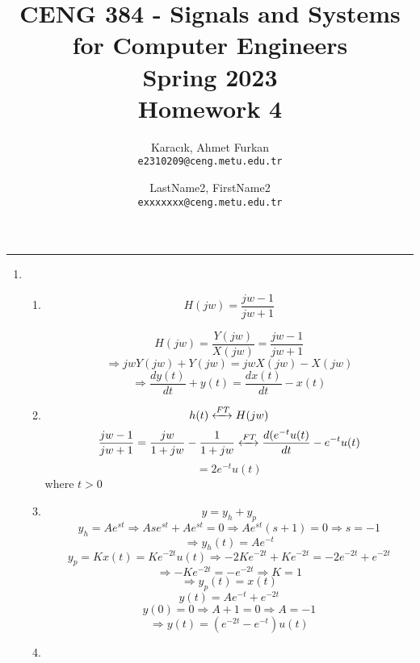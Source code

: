 \documentclass[10pt,a4paper, margin=1in]{article}
\author{
  Karacık, Ahmet Furkan\\
  \texttt{e2310209@ceng.metu.edu.tr}
  \and
  LastName2, FirstName2\\
  \texttt{exxxxxxx@ceng.metu.edu.tr}
}
\title{CENG 384 - Signals and Systems for Computer Engineers \\
Spring 2023 \\
Homework 4}
\begin{document}
\maketitle



\noindent\rule{19cm}{1.2pt}

\begin{enumerate}

\item %
	\begin{enumerate}
    \item %

\[H(jw) = \frac{jw-1}{jw+1}\]

\[H(jw) = \frac{Y(jw)}{X(jw)} = \frac{jw-1}{jw+1}\]
\[\Rightarrow jwY(jw) + Y(jw) = jwX(jw) - X(jw)\]
\[\Rightarrow \frac{dy(t)}{dt} + y(t) = \frac{dx(t)}{dt} - x(t)\]

\item
\[h(t) \xleftrightarrow{FT} H(jw)\]
\[\frac{jw-1}{jw+1} = \frac{jw}{1 + jw} - \frac{1}{1 + jw} \xleftrightarrow{FT} \frac{d(e^{-t}u(t)}{dt} - e^{-t}u(t)\]
\[= 2e^{-t}u(t)\] where \(t > 0\)
    \item %
\[y = y_h + y_p\]
\[y_h = Ae^{st} \Rightarrow Ase^{st} + Ae^{st} = 0 \Rightarrow Ae^{st}(s+1) = 0 \Rightarrow s = -1\]
\[\Rightarrow y_{h}(t) = Ae^{-t}\]
\[y_p = Kx(t) = Ke^{-2t}u(t) \Rightarrow -2Ke^{-2t} + Ke^{-2t} = -2e^{-2t} + e^{-2t}\]
\[\Rightarrow -Ke^{-2t} = -e^{-2t} \Rightarrow K = 1\]
\[\Rightarrow y_{p}(t) = x(t)\]
\[y(t) = Ae^{-t} + e^{-2t}\]
\[y(0) = 0 \Rightarrow A + 1 = 0 \Rightarrow A = -1\]
\[\Rightarrow y(t) = (e^{-2t} - e^{-t})u(t)\]
	\item\\ %
$ $

\begin{center}
	\newcommand{\suma}{\Large$+$}
	\newcommand{\inte}{$\displaystyle \int$}
	\newcommand{\derv}{\huge$\frac{d}{dt}$}


\end{center}
\end{enumerate}
\end{enumerate}
\end{document}
